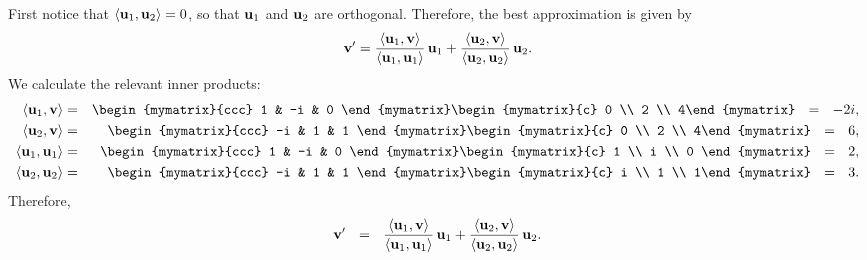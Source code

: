 \begin{solution}
  First notice that $\iprod{\vect{u}_1,\vect{u}_2}=0$, so that
  $\vect{u}_1$ and $\vect{u}_2$ are orthogonal. Therefore, the best
  approximation is given by
  \begin{equation*}
    \vect{v}' =
    \frac{\iprod{\vect{u}_1,\vect{v}}}{\iprod{\vect{u}_1,\vect{u}_1}}\,\vect{u}_1
    + \frac{\iprod{\vect{u}_2,\vect{v}}}{\iprod{\vect{u}_2,\vect{u}_2}}\,\vect{u}_2.
  \end{equation*}
  We calculate the relevant inner products:
  \begin{eqnarray*}
    \iprod{\vect{u}_1,\vect{v}}
    &=& \begin{mymatrix}{ccc} 1 & -i & 0 \end{mymatrix}
        \begin{mymatrix}{c} 0 \\ 2 \\ 4\end{mymatrix}
    ~~=~~ -2i, \\
    \iprod{\vect{u}_2,\vect{v}}
    &=& \begin{mymatrix}{ccc} -i & 1 & 1 \end{mymatrix}
        \begin{mymatrix}{c} 0 \\ 2 \\ 4\end{mymatrix}
    ~~=~~ 6, \\
    \iprod{\vect{u}_1,\vect{u}_1}
    &=& \begin{mymatrix}{ccc} 1 & -i & 0 \end{mymatrix}
        \begin{mymatrix}{c} 1 \\ i \\ 0 \end{mymatrix}
    ~~=~~ 2, \\
    \iprod{\vect{u}_2,\vect{u}_2}
    &=& \begin{mymatrix}{ccc} -i & 1 & 1 \end{mymatrix}
        \begin{mymatrix}{c} i \\ 1 \\ 1\end{mymatrix}
    ~~=~~ 3.
  \end{eqnarray*}
  Therefore,
  \begin{equation*}
    \vect{v}'
    ~~=~~
    \frac{\iprod{\vect{u}_1,\vect{v}}}{\iprod{\vect{u}_1,\vect{u}_1}}\,\vect{u}_1
    + \frac{\iprod{\vect{u}_2,\vect{v}}}{\iprod{\vect{u}_2,\vect{u}_2}}\,\vect{u}_2.

\end{equation*}
\end{solution}
